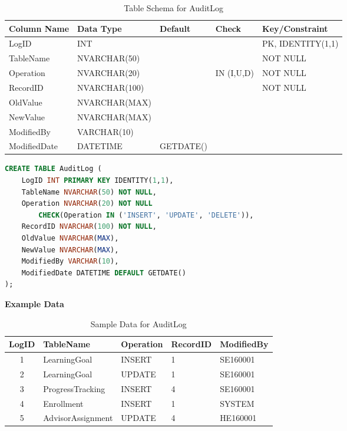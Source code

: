 \documentclass[12pt,a4paper]{report}
\begin{document}
\begin{table}[ht]
\centering
\small
\begin{tabular}{|l|l|l|l|l|}
\hline
\textbf{Column Name} & \textbf{Data Type} & \textbf{Default} & \textbf{Check} & \textbf{Key/Constraint} \\ \hline
LogID & INT & & & PK, IDENTITY(1,1) \\ \hline
TableName & NVARCHAR(50) & & & NOT NULL \\ \hline
Operation & NVARCHAR(20) & & IN (I,U,D) & NOT NULL \\ \hline
RecordID & NVARCHAR(100) & & & NOT NULL \\ \hline
OldValue & NVARCHAR(MAX) & & & \\ \hline
NewValue & NVARCHAR(MAX) & & & \\ \hline
ModifiedBy & VARCHAR(10) & & & \\ \hline
ModifiedDate & DATETIME & GETDATE() & & \\ \hline
\end{tabular}
\caption{Table Schema for AuditLog}
\label{tab:audit_log_schema}
\end{table}

\vspace{0.3cm}

\begin{lstlisting}[language=SQL, caption=Create Table AuditLog]
CREATE TABLE AuditLog (
    LogID INT PRIMARY KEY IDENTITY(1,1),
    TableName NVARCHAR(50) NOT NULL,
    Operation NVARCHAR(20) NOT NULL 
        CHECK(Operation IN ('INSERT', 'UPDATE', 'DELETE')),
    RecordID NVARCHAR(100) NOT NULL,
    OldValue NVARCHAR(MAX),
    NewValue NVARCHAR(MAX),
    ModifiedBy VARCHAR(10),
    ModifiedDate DATETIME DEFAULT GETDATE()
);
\end{lstlisting}

\textbf{Example Data}

\begin{table}[ht]
\centering
\small
\begin{tabular}{|c|l|l|l|l|}
\hline
\textbf{LogID} & \textbf{TableName} & \textbf{Operation} & \textbf{RecordID} & \textbf{ModifiedBy} \\ \hline
1 & LearningGoal & INSERT & 1 & SE160001 \\ \hline
2 & LearningGoal & UPDATE & 1 & SE160001 \\ \hline
3 & ProgressTracking & INSERT & 4 & SE160001 \\ \hline
4 & Enrollment & INSERT & 1 & SYSTEM \\ \hline
5 & AdvisorAssignment & UPDATE & 4 & HE160001 \\ \hline
\end{tabular}
\caption{Sample Data for AuditLog}
\label{tab:audit_log_data}
\end{table}
\end{document}
